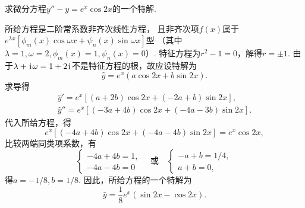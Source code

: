 \begin{example}
求微分方程\(y'' - y = e^x \cos2x\)的一个特解.
\begin{solution}
所给方程是二阶常系数非齐次线性方程，
且非齐次项\(f(x)\)属于\(e^{\lambda x} [\phi_m(x) \cos\omega x + \psi_n(x) \sin\omega x]\)型
（其中\(\lambda=1,
\omega=2,
\phi_m(x) = 1,
\psi_n(x) = 0\)）.
特征方程为\(r^2-1=0\)，解得\(r=\pm1\).
由于\(\lambda+\kern1pt\mathrm{i}\kern1pt\omega=1+2\kern1pt\mathrm{i}\kern1pt\)不是特征方程的根，故应设特解为\begin{equation*}
	\hat{y} = e^x (a \cos2x + b \sin2x).
\end{equation*}
求导得\begin{gather*}
	\hat{y}' = e^x [(a+2b) \cos2x + (-2a+b) \sin2x], \\
	\hat{y}'' = e^x [(-3a+4b) \cos2x + (-4a-3b) \sin2x].
\end{gather*}
代入所给方程，得\begin{equation*}
	e^x [(-4a+4b) \cos2x + (-4a-4b) \sin2x]
	= e^x \cos2x,
\end{equation*}
比较两端同类项系数，有\begin{equation*}
	\left\{ \begin{array}{l}
		-4a+4b=1, \\
		-4a-4b=0
	\end{array} \right.
	\quad\text{或}\quad
	\left\{ \begin{array}{l}
		-a+b=1/4, \\
		a+b=0,
	\end{array} \right.
\end{equation*}
得\(a = -1/8,
b = 1/8\).
因此，所给方程的一个特解为\begin{equation*}
	\hat{y} = \frac{1}{8} e^x (\sin2x - \cos2x).
\end{equation*}
\end{solution}
\end{example}

